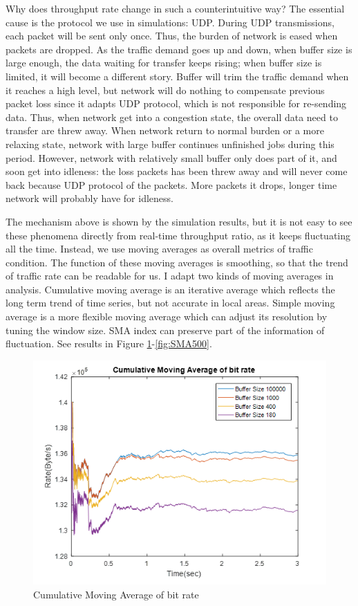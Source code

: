 \documentclass[a4paper]{article}
\begin{document}
	
Why does throughput rate change in such a counterintuitive way? The essential cause is the protocol we use in simulations: UDP. During UDP transmissions, each packet will be sent only once. Thus, the burden of network is eased when packets are dropped. As the traffic demand goes up and down, when buffer size is large enough, the data waiting for transfer keeps rising; when buffer size is limited, it will become a different story. Buffer will trim the traffic demand when it reaches a high level, but network will do nothing to compensate previous packet loss since it adapts UDP protocol, which is not responsible for re-sending data. Thus, when network get into a congestion state, the overall data need to transfer are threw away. When network return to normal burden or a more relaxing state, network with large buffer continues unfinished jobs during this period. However, network with relatively small buffer only does part of it, and soon get into idleness: the loss packets has been threw away and will never come back because UDP protocol of the packets. More packets it drops, longer time network will probably have for idleness.
	
The mechanism above is shown by the simulation results, but it is not easy to see these phenomena directly from real-time throughput ratio, as it keeps fluctuating all the time. Instead, we use moving averages as overall metrics of traffic condition. The function of these moving averages is smoothing, so that the trend of traffic rate can be readable for us. I adapt two kinds of moving averages in analysis. Cumulative moving average is an iterative average which reflects the long term trend of time series, but not accurate in local areas. Simple moving average is a more flexible moving average which can adjust its resolution by tuning the window size. SMA index can preserve part of the information of fluctuation. See results in Figure \ref{fig:CMA}-\ref{fig:SMA500}.

\begin{figure}
\centering
\includegraphics[width=1\textwidth]{CMA.png}
\caption{\label{fig:CMA}Cumulative Moving Average of bit rate }
\end{figure}
\end{document}
